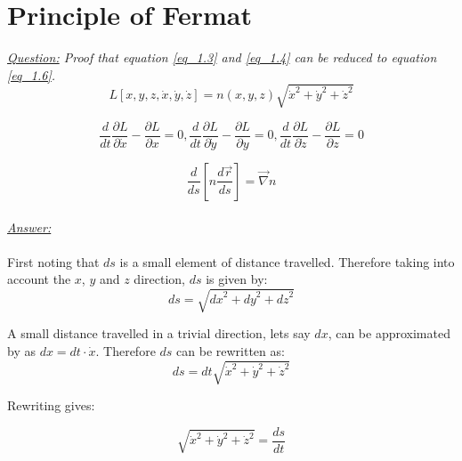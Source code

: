 \documentclass{article}
\begin{document}
\section{Principle of Fermat}

\textit{\underline{Question:} Proof that equation \ref{eq_1.3} and \ref{eq_1.4} can be reduced to equation \ref{eq_1.6}.} \\

\begin{equation}
	\label{eq_1.3}
	L[x,y,z,\dot{x},\dot{y},\dot{z}] = n(x,y,z)\sqrt{\dot{x}^2+\dot{y}^2+\dot{z}^2}
\end{equation}

\begin{equation}
	\label{eq_1.4}
	\frac{d}{dt} \frac{\partial L}{\partial \dot{x}} - \frac{\partial L}{\partial x} = 0, \frac{d}{dt} \frac{\partial L}{\partial \dot{y}} - \frac{\partial L}{\partial y} = 0, \frac{d}{dt} \frac{\partial L}{\partial \dot{z}} - \frac{\partial L}{\partial z} = 0
\end{equation}

\begin{equation}
	\label{eq_1.6}
	\frac{d}{ds} \left[ n \frac{d \vec{r}}{ds} \right] = \vec{\nabla} n
\end{equation} \\
\textit{\underline{Answer:}}\\
\\
First noting that $ds$ is a small element of distance travelled. Therefore taking into account the $x$, $y$ and $z$ direction, $ds$ is given by: \\

\begin{equation*}
	ds = \sqrt{{dx}^2+{dy}^2+{dz}^2}
\end{equation*}

A small distance travelled in a trivial direction, lets say $dx$, can be approximated by as $dx = dt \cdot \dot{x}$. Therefore $ds$ can be rewritten as: \\

\begin{equation*}
	ds = dt \sqrt{\dot{x}^2+\dot{y}^2+\dot{z}^2}
\end{equation*}

Rewriting gives:

\begin{equation}
	\label{eq_dsdt}
	\sqrt{\dot{x}^2+\dot{y}^2+\dot{z}^2} = \frac{ds}{dt}
\end{equation}
\end{document}
